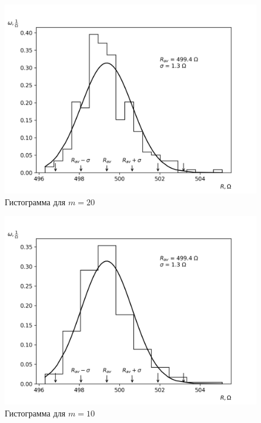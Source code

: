 \documentclass[14pt, a4paper]{article}
\begin{document}
\begin{figure}
\includegraphics[width=\linewidth]{laba1m20.png}
\caption{Гистограмма для $m=20$}
\label{image1}
\end{figure}

\begin{figure}
\includegraphics[width=\linewidth]{laba1m10.png}
\caption{Гистограмма для $m=10$}
\label{image2}
\end{figure}
\end{document}
